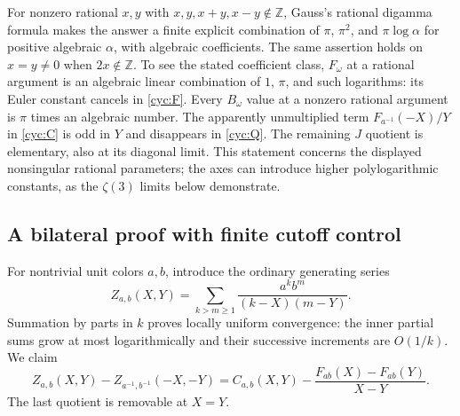 For nonzero rational $x,y$ with $x,y,x+y,x-y\notin\mathbb Z$,
Gauss's rational digamma formula \cite[Eq.~(5.4.19)]{DLMFGamma}
makes the answer a finite explicit
combination of $\pi$, $\pi^2$, and $\pi\log\alpha$ for positive
algebraic $\alpha$, with algebraic coefficients.  The same assertion
holds on $x=y\ne0$ when $2x\notin\mathbb Z$.  To see the stated
coefficient class, $F_\omega$ at a rational argument is an algebraic
linear combination of $1$, $\pi$, and such logarithms: its Euler
constant cancels in \eqref{cyc:F}.  Every $B_\omega$ value at a
nonzero rational argument is $\pi$ times an algebraic number.
The apparently unmultiplied term $F_{a^{-1}}(-X)/Y$ in
\eqref{cyc:C} is odd in $Y$ and disappears in \eqref{cyc:Q}.
The remaining $J$ quotient is elementary, also at its diagonal
limit.  This statement concerns the displayed nonsingular rational
parameters; the axes can introduce higher polylogarithmic constants,
as the $\zeta(3)$ limits below demonstrate.

\subsection{A bilateral proof with finite cutoff control}

For nontrivial unit colors $a,b$, introduce the ordinary generating
series
\[
 Z_{a,b}(X,Y)=\sum_{k>m\ge1}\frac{a^k b^m}{(k-X)(m-Y)}.
\]
Summation by parts in $k$ proves locally uniform convergence: the inner
partial sums grow at most logarithmically and their successive
increments are $O(1/k)$.  We claim
\begin{equation}\label{cyc:bilateral-generator}
 Z_{a,b}(X,Y)-Z_{a^{-1},b^{-1}}(-X,-Y)
 =C_{a,b}(X,Y)-\frac{F_{ab}(X)-F_{ab}(Y)}{X-Y}.
\end{equation}
The last quotient is removable at $X=Y$.

